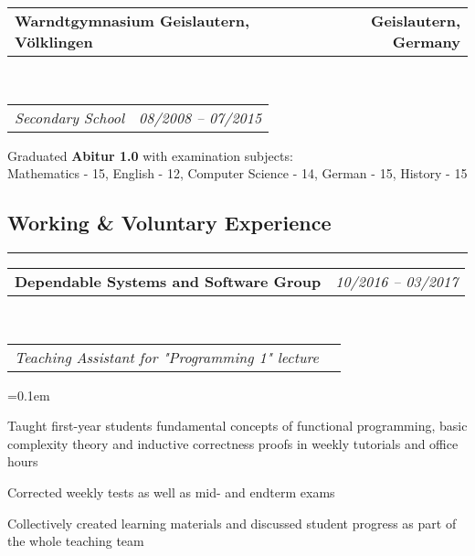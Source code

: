 \documentclass[10pt,letterpaper]{article}
\makeatletter
\newcommand{\headerrow}[2]
{\begin{tabular*}{\linewidth}{l@{\extracolsep{\fill}}r}
	#1 &
	#2 \\
\end{tabular*}}
\makeatother
\begin{document}
\noindent
\headerrow{\textbf{Warndtgymnasium Geislautern, Völklingen}}{\textbf{Geislautern, Germany}}
\\
\headerrow{\emph{Secondary School}}{\emph{08/2008 -- 07/2015}}
\vspace{-1.6em}
\begin{itemize*}
	\item Graduated \textbf{Abitur 1.0} with examination subjects:\\
       Mathematics - 15, English - 12, Computer Science - 14, German - 15, History - 15
\end{itemize*}


\subsection*{Working \& Voluntary Experience}
\hrule
\vspace{0.4em}

\noindent
\headerrow{\textbf{Dependable Systems and Software Group}}{\emph{10/2016 -- 03/2017}}
\\
\headerrow{\emph{Teaching Assistant for "Programming 1" lecture}}{}
\vspace{-1.6em}
\begin{itemize*}
    \parskip=0.1em
    \item Taught first-year students fundamental concepts of functional programming, basic complexity theory and inductive correctness proofs in weekly tutorials and office hours
    \item Corrected weekly tests as well as mid- and endterm exams
    \item Collectively created learning materials and discussed student progress as part of the whole teaching team
\end{itemize*}
\end{document}
